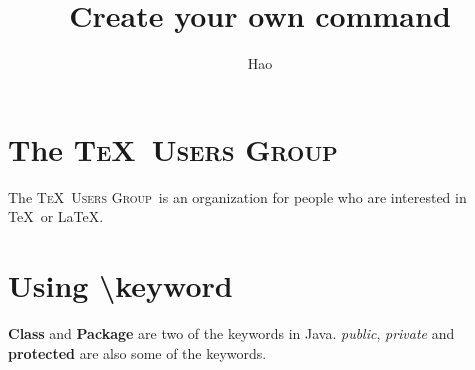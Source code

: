 \documentclass[a4paper,10pt]{article}
\title{Create your own command}
\author{Hao}
\newcommand{\TUG}{\textsc{\TeX\ Users Group}}
\newcommand{\keyword}[1]{\textbf{#1}}
\newcommand{\keywordWithFont}[2][\bfseries]{{#1#2}}
\begin{document}
\maketitle

\begin{abstract}

\end{abstract}

\section{The \TUG}
The \TUG\ is an organization for people who are interested in \TeX\ or \LaTeX .

\section{Using \textbackslash keyword}
\keyword{Class} and \keyword{Package} are two of the keywords in Java.
\keywordWithFont[\itshape]{public}, \keywordWithFont[\slshape]{private} and \keywordWithFont{protected} 
are also some of the keywords.
\end{document}
